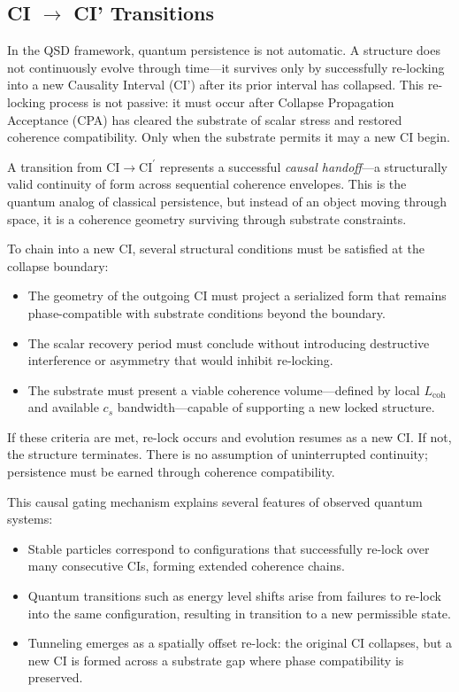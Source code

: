 \documentclass[preprints,article,submit,pdftex,moreauthors]{Definitions/mdpi}
\begin{document}
\subsection{CI \texorpdfstring{$\rightarrow$}{->} CI' Transitions}

In the QSD framework, quantum persistence is not automatic. A structure does not continuously evolve through time—it survives only by successfully re-locking into a new Causality Interval (CI') after its prior interval has collapsed. This re-locking process is not passive: it must occur after Collapse Propagation Acceptance (CPA) has cleared the substrate of scalar stress and restored coherence compatibility. Only when the substrate permits it may a new CI begin.

A transition from $\text{CI} \rightarrow \text{CI}^{\prime}$ represents a successful \emph{causal handoff}—a structurally valid continuity of form across sequential coherence envelopes. This is the quantum analog of classical persistence, but instead of an object moving through space, it is a coherence geometry surviving through substrate constraints.

To chain into a new CI, several structural conditions must be satisfied at the collapse boundary:
\begin{itemize}
    \item The geometry of the outgoing CI must project a serialized form that remains phase-compatible with substrate conditions beyond the boundary.
    \item The scalar recovery period must conclude without introducing destructive interference or asymmetry that would inhibit re-locking.
    \item The substrate must present a viable coherence volume—defined by local $L_{\text{coh}}$ and available $c_s$ bandwidth—capable of supporting a new locked structure.
\end{itemize}

If these criteria are met, re-lock occurs and evolution resumes as a new CI. If not, the structure terminates. There is no assumption of uninterrupted continuity; persistence must be earned through coherence compatibility.

This causal gating mechanism explains several features of observed quantum systems:
\begin{itemize}
    \item Stable particles correspond to configurations that successfully re-lock over many consecutive CIs, forming extended coherence chains.
    \item Quantum transitions such as energy level shifts arise from failures to re-lock into the same configuration, resulting in transition to a new permissible state.
    \item Tunneling emerges as a spatially offset re-lock: the original CI collapses, but a new CI is formed across a substrate gap where phase compatibility is preserved.
\end{itemize}
\end{document}
